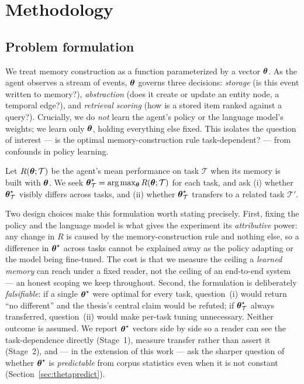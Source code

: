 \chapter{Methodology}
\label{ch:method}

\section{Problem formulation}
We treat memory construction as a function parameterized by a vector
$\boldsymbol{\theta}$. As the agent observes a stream of events, $\boldsymbol{\theta}$ governs three
decisions: \emph{storage} (is this event written to memory?), \emph{abstraction}
(does it create or update an entity node, a temporal edge?), and \emph{retrieval
scoring} (how is a stored item ranked against a query?). Crucially, we do
\emph{not} learn the agent's policy or the language model's weights; we learn
only $\boldsymbol{\theta}$, holding everything else fixed. This isolates the question of
interest --- is the optimal memory-construction rule task-dependent? --- from
confounds in policy learning.

Let $R(\boldsymbol{\theta}; \mathcal{T})$ be the agent's mean performance on task
$\mathcal{T}$ when its memory is built with $\boldsymbol{\theta}$. We seek
$\boldsymbol{\theta}^\star_{\mathcal{T}} = \arg\max_{\boldsymbol{\theta}} R(\boldsymbol{\theta}; \mathcal{T})$
for each task, and ask (i) whether $\boldsymbol{\theta}^\star_{\mathcal{T}}$ visibly
differs across tasks, and (ii) whether $\boldsymbol{\theta}^\star_{\mathcal{T}}$ transfers
to a related task $\mathcal{T}'$.

Two design choices make this formulation worth stating precisely. First, fixing
the policy and the language model is what gives the experiment its
\emph{attributive} power: any change in $R$ is caused by the memory-construction
rule and nothing else, so a difference in $\boldsymbol{\theta}^\star$ across tasks cannot be
explained away as the policy adapting or the model being fine-tuned. The cost is
that we measure the ceiling a \emph{learned memory} can reach under a fixed
reader, not the ceiling of an end-to-end system --- an honest scoping we keep
throughout. Second, the formulation is deliberately \emph{falsifiable}: if a
single $\boldsymbol{\theta}^\star$ were optimal for every task, question~(i) would return
``no different'' and the thesis's central claim would be refuted; if
$\boldsymbol{\theta}^\star_{\mathcal{T}}$ always transferred, question~(ii) would make
per-task tuning unnecessary. Neither outcome is assumed. We report
$\boldsymbol{\theta}^\star$ vectors side by side so a reader can see the task-dependence
directly (Stage~1), measure transfer rather than assert it (Stage~2), and --- in
the extension of this work --- ask the sharper question of whether
$\boldsymbol{\theta}^\star$ is \emph{predictable} from corpus statistics even when it is not
constant (Section~\ref{sec:thetapredict}).

